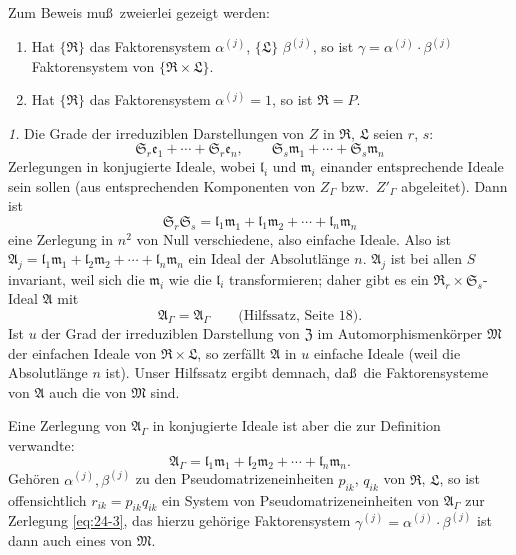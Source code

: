\documentclass[12pt,a4paper]{article}
\theoremstyle{plain}
\theoremstyle{definition}
\theoremstyle{remark}
\begin{document}
Zum Beweis mu\ss\ zweierlei gezeigt werden:
\begin{enumerate}
\item Hat $\{\mathfrak{R}\}$ das Faktorensystem $\alpha^{(j)}$, $\{\mathfrak{L}\}$ $\beta^{(j)}$, so ist
$\gamma = \alpha^{(j)} \cdot \beta^{(j)}$ Faktorensystem von $\{\mathfrak{R} \times \mathfrak{L}\}$.
\item Hat $\{\mathfrak{R}\}$ das Faktorensystem $\alpha^{(j)} = 1$, so ist $\mathfrak{R} = P$.
\end{enumerate}

\textit{1.} Die Grade der irreduziblen Darstellungen von $Z$ in $\mathfrak{R}$, $\mathfrak{L}$ seien
$r$, $s$:
\[
\mathfrak{S}_{r}\mathfrak{e}_{1} + \cdots + \mathfrak{S}_{r}\mathfrak{e}_{n}, \qquad
\mathfrak{S}_{s}\mathfrak{m}_{1} + \cdots + \mathfrak{S}_{s}\mathfrak{m}_{n}
\]
Zerlegungen in konjugierte Ideale, wobei $\mathfrak{l}_{i}$ und $\mathfrak{m}_{i}$ einander
entsprechende Ideale sein sollen (aus entsprechenden Komponenten von $Z_{\varGamma}$
bzw.\ $Z'_{\varGamma}$ abgeleitet). Dann ist
\[
\mathfrak{S}_{r}\mathfrak{S}_{s} = \mathfrak{l}_{1}\mathfrak{m}_{1} + \mathfrak{l}_{1}\mathfrak{m}_{2} + \cdots + \mathfrak{l}_{n}\mathfrak{m}_{n}
\]
eine Zerlegung in $n^{2}$ von Null verschiedene, also einfache Ideale. Also ist
$\mathfrak{A}_{j} = \mathfrak{l}_{1}\mathfrak{m}_{1} + \mathfrak{l}_{2}\mathfrak{m}_{2} + \cdots + \mathfrak{l}_{n}\mathfrak{m}_{n}$ ein Ideal der Absolutl\"ange $n$.
$\mathfrak{A}_{j}$ ist bei allen $S$ invariant, weil sich die $\mathfrak{m}_{i}$ wie die $\mathfrak{l}_{i}$
transformieren; daher gibt es ein $\mathfrak{R}_{r} \times \mathfrak{S}_{s}$-Ideal $\mathfrak{A}$ mit
\[
\mathfrak{A}_{\varGamma} = \mathfrak{A}_{\varGamma} \qquad \text{(Hilfssatz, Seite~18)}.
\]
Ist $u$ der Grad der irreduziblen Darstellung von $\mathfrak{Z}$ im Automorphismenk\"orper
$\mathfrak{M}$ der einfachen Ideale von $\mathfrak{R} \times \mathfrak{L}$, so zerf\"allt $\mathfrak{A}$ in $u$ einfache Ideale
(weil die Absolutl\"ange $n$ ist). Unser Hilfssatz ergibt demnach, da\ss\ die
Faktorensysteme von $\mathfrak{A}$ auch die von $\mathfrak{M}$ sind.

Eine Zerlegung von $\mathfrak{A}_{\varGamma}$ in konjugierte Ideale ist aber die zur Definition
verwandte:
\begin{equation}\label{eq:24-3}
\mathfrak{A}_{\varGamma} = \mathfrak{l}_{1}\mathfrak{m}_{1} + \mathfrak{l}_{2}\mathfrak{m}_{2} + \cdots + \mathfrak{l}_{n}\mathfrak{m}_{n}.
\end{equation}
Geh\"oren $\alpha^{(j)}, \beta^{(j)}$ zu den Pseudomatrizeneinheiten $p_{ik}$, $q_{ik}$
von $\mathfrak{R}$, $\mathfrak{L}$, so ist offensichtlich $r_{ik} = p_{ik}q_{ik}$ ein System von
Pseudomatrizeneinheiten von $\mathfrak{A}_{\varGamma}$ zur Zerlegung \eqref{eq:24-3}, das hierzu
geh\"orige Faktorensystem $\gamma^{(j)} = \alpha^{(j)} \cdot \beta^{(j)}$ ist dann auch eines
von $\mathfrak{M}$.
\end{document}
